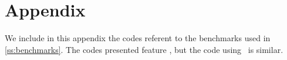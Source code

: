 \vspace{-0.8cm}
\section*{Appendix}
\vspace{-0.2cm}
We include in this appendix the codes referent to the benchmarks used in \ref{ss:benchmarks}. The codes presented feature \secint, but the code using \secuint\ is similar.

\vspace{-0.1cm}

\vspace{-1.3cm}














